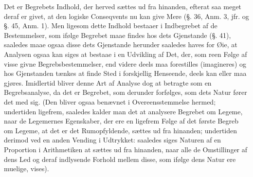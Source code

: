 \documentclass[12pt]{book}
\def\textit#1{#1}%
\def\emph#1{#1}%
\newcommand{\opage}[1]{\marginnote{\footnotesize\textit{[#1]}}}
\begin{document}
Det er Begrebets Indhold, der herved sættes ud fra hinanden, efterat saa meget
deraf er givet, at den logiske Conseqvents nu kan give
\opage{210} \emph{Mere} (§. 36, Anm. 3, jfr. og §. 45, Anm. 1). Men ligesom dette Indhold
bestaaer i Indbegrebet af de Bestemmelser, som ifølge Begrebet maae findes hos
dets Gjenstande (§. 41), saaledes maae ogsaa disse dets Gjenstande herunder
saaledes haves for Øie, at Analysen ogsaa kan siges at bestaae i en Udvikling af
Det, der, som reen Følge af visse givne Begrebsbestemmelser, end videre deels maa
forestilles (\emph{imagineres}) og hos Gjenstanden tænkes at finde Sted i
forskjellig Henseende, deels kan eller maa gjøres. Imidlertid bliver denne Art af
Analyse dog at betragte som en Begrebsanalyse, da det er Begrebet, som derunder
forfølges, som dets Natur fører det med sig. (Den bliver ogsaa benævnet i
Overeensstemmelse hermed; undertiden ligefrem, saaledes kalder man det at
analysere Begrebet om Legeme, naar de Legemernes Egenskaber, der ere en ligefrem
Følge af det første Begreb om Legeme, at det er det Rumopfyldende, sættes ud fra
hinanden; undertiden derimod ved en anden Vending i Udtrykket: saaledes siges
\emph{Naturen} af en \emph{Proportion} i \emph{Arithmetiken} at sættes ud fra
hinanden, naar alle de Omstillinger af dens Led og deraf indlysende Forhold mellem
disse, som ifølge dens Natur ere muelige, vises).
\end{document}

